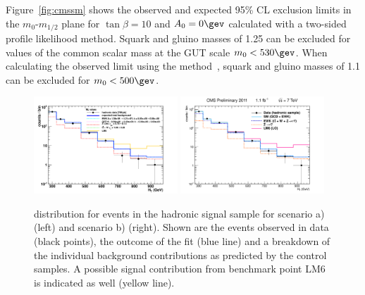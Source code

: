 Figure~\ref{fig:cmssm} shows the observed and expected 95\% CL
exclusion limits in the $m_0$-$m_{1/2}$ plane for $\tan \beta = 10$
and $A_0 = 0 \gev$ calculated with a two-sided profile likelihood
method.  Squark and gluino masses of 1.25 \TeV can be excluded for
values of the common scalar mass at the GUT scale $m_0 < 530
\gev$. When calculating the observed limit using the \cls
method~\cite{cls-pdg}, squark and gluino masses of 1.1 \TeV can be
excluded for $m_0 < 500 \gev$.

 \begin{figure}[t]
   \begin{center}
     \includegraphics[width = 0.48\textwidth]{figures/stats_plots/RQcdZero/hadronic_signal_fit_logy.pdf}
     \includegraphics[width = 0.48\textwidth]{figures/stats_plots/RQcdFallingExp/hadronic_signal_fit_logy.pdf}
     \caption{\label{fig:hadronic} \scalht distribution for events in the hadronic signal sample for scenario a) (left) and scenario b) (right). Shown are the events observed in data (black points), the outcome of the fit (blue line) and a breakdown of the individual background contributions as predicted by the control samples. A possible signal contribution from benchmark point LM6 is indicated as well (yellow line).}
   \end{center}
 \end{figure}

